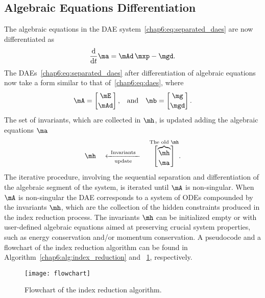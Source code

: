 \subsection{Algebraic Equations Differentiation}
\label{chap6:sec:differentiation}

The algebraic equations in the \ac{DAE} system~\eqref{chap6:eq:separated_daes} are now differentiated as
%
\begin{equation}
  \label{chap6:eq:diff_daes}
  \dfrac{\mathrm{d}}{\mathrm{d}t} \ma = \mAd \, \mxp - \mgd \text{.}
\end{equation}
%
The \acp{DAE}~\eqref{chap6:eq:separated_daes} after differentiation of algebraic equations now take a form similar to that of~\eqref{chap6:eq:daes}, where
%
\begin{equation}
  \label{chap6:eq:reduced_daes}
  \mA = \begin{bmatrix} \mE \\[0.2em] \mAd\end{bmatrix} \text{,}
  \quad \text{and} \quad
  \mb = \begin{bmatrix} \mg \\[0.2em] \mgd\end{bmatrix} \text{.}
\end{equation}
%
The set of invariants, which are collected in $\mh$, is updated adding the algebraic equations $\ma$
%
\begin{equation}
  \mh \quad \xleftarrow[\text{update}]{\text{\, Invariants \,}} \quad \overset{{\text{The old $\mh$}}}{\begin{bmatrix} \overbrace{\mh} \\[0.2em] \ma \end{bmatrix}}.
\end{equation}
%
The iterative procedure, involving the sequential separation and differentiation of the algebraic segment of the system, is iterated until $\mA$ is non-singular. When $\mA$ is non-singular the \ac{DAE} corresponds to a system of \acp{ODE} compounded by the invariants $\mh$, which are the collection of the hidden constraints produced in the index reduction process. The invariants $\mh$ can be initialized empty or with user-defined algebraic equations aimed at preserving crucial system properties, such as energy conservation and/or momentum conservation. A pseudocode and a flowchart of the index reduction algorithm can be found in Algorithm~\ref{chap6:alg:index_reduction} and \figurename~\ref{chap6:fig:index_reduction}, respectively.

\begin{figure}
  \centering
  \texttt{[image: flowchart]}
  \caption{Flowchart of the index reduction algorithm.}
  \label{chap6:fig:index_reduction}
\end{figure}

